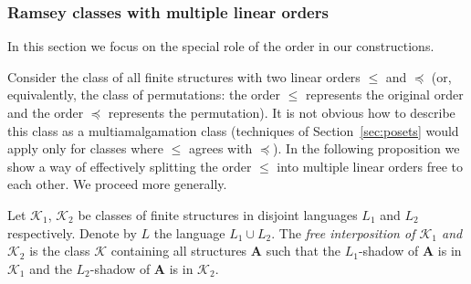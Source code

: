 \documentclass{elsarticle}
\def\str#1{\mathbf {#1}}
\def\K{{\mathcal K}}
\theoremstyle{plain}
\theoremstyle{definition}
\theoremstyle{remark}
\begin{document}
\subsubsection{Ramsey classes with multiple linear orders}
\label{sec:manyorders}
In this section we focus on the special role of the order in our constructions.

Consider the class of all finite structures with two linear orders $\leq$ and
$\preceq$ (or, equivalently, the class of permutations: the order
$\leq$ represents the original order and the order $\preceq$ represents the
permutation).  It is not obvious how to describe this class as a multiamalgamation
class (techniques of Section~\ref{sec:posets} would apply only for classes
where $\leq$ agrees with $\preceq$).
In the following proposition we show a way of effectively splitting the order
$\leq$ into multiple linear orders free to each other. We proceed more generally.

Let $\K_1$, $\K_2$ be classes of finite structures in disjoint languages
$L_1$ and $L_2$ respectively. Denote by $L$ the language $L_1\cup L_2$.  The
\emph{free interposition of $\K_1$ and $\K_2$} is the class $\K$
containing all structures $\str{A}$ such that the $L_1$-shadow of $\str{A}$ is in 
$\K_1$ and the $L_2$-shadow of $\str{A}$ is in $\K_2$.
\end{document}
